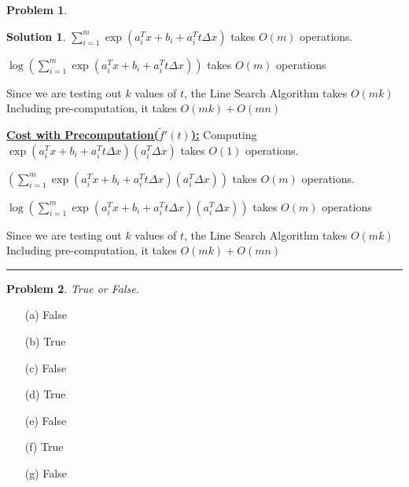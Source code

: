 \documentclass{article}
\theoremstyle{definition}
\newtheorem{problem}{Problem}
\def\fline{\rule{0.75\linewidth}{0.5pt}}
\newcommand{\finishline}{\begin{center}\fline\end{center}}
\newtheorem*{solution*}{Solution}
\newenvironment{solution}{\begin{solution*}}{{\finishline} \end{solution*}}
\begin{document}
\begin{problem}
\begin{enumerate}
\begin{solution}
        $\sum_{i=1}^{m} \exp(a_i^Tx + b_i + a_i^T t\Delta x)$ takes $O(m)$ operations. 

        $\log(\sum_{i=1}^{m} \exp(a_i^Tx + b_i + a_i^T t\Delta x))$ takes $O(m)$ operations
        
        Since we are testing out $k$ values of $t$, the Line Search Algorithm takes $O(mk)$ \newline 
        Including pre-computation, it takes $O(mk) + O(mn)$ \newline 
        
        \textbf{\underline{Cost with Precomputation($\tilde{f}'(t)$):}} \newline 
        Computing $\exp(a_i^Tx + b_i + a_i^T t\Delta x) (a_i^T \Delta x)$ takes $O(1)$ operations.
        
        $(\sum_{i=1}^{m} \exp(a_i^Tx + b_i + a_i^T t\Delta x) (a_i^T \Delta x))$ takes $O(m)$ operations. 

        $\log(\sum_{i=1}^{m} \exp(a_i^Tx + b_i + a_i^T t\Delta x) (a_i^T \Delta x))$ takes $O(m)$ operations
        
        Since we are testing out $k$ values of $t$, the Line Search Algorithm takes $O(mk)$ \newline 
    Including pre-computation, it takes $O(mk) + O(mn)$ \newline 
    \end{solution}
    
\end{enumerate}

\end{problem}

\begin{problem}
\textit{True or False.} 

\begin{enumerate}
\item[(a)] False
\item[(b)] True
\item[(c)] False
\item[(d)] True
\item[(e)] False
\item[(f)] True
\item[(g)] False
\end{enumerate}
\end{problem}
\end{document}
